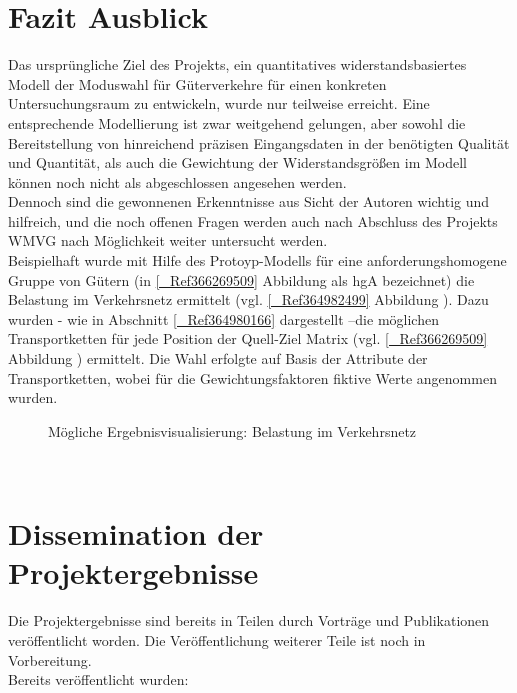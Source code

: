 % 
\section{Fazit Ausblick }
\label{_Ref365538178}
\label{_Toc365801618}
\label{_Toc366766128}
\label{_Toc366775322}
Das ursprüngliche Ziel des Projekts, ein quantitatives widerstandsbasiertes Modell der Moduswahl für Güterverkehre für einen konkreten Untersuchungsraum zu entwickeln, wurde nur teilweise erreicht. Eine entsprechende Modellierung ist zwar weitgehend gelungen, aber sowohl die Bereitstellung von hinreichend präzisen Eingangsdaten in der benötigten Qualität und Quantität, als auch die Gewichtung der Widerstandsgrößen im Modell können noch nicht als abgeschlossen angesehen werden.~\\
Dennoch sind die gewonnenen Erkenntnisse aus Sicht der Autoren wichtig und hilfreich, und die noch offenen Fragen werden auch nach Abschluss des Projekts WMVG nach Möglichkeit weiter untersucht werden. ~\\

\label{_Toc365801619}
\label{_Toc365011598} Beispielhaft wurde mit Hilfe des Protoyp-Modells für eine anforderungshomogene Gruppe von Gütern (in \autoref{_Ref366269509} Abbildung  als hgA bezeichnet) die Belastung im Verkehrsnetz ermittelt (vgl. \autoref{_Ref364982499} Abbildung ). Dazu wurden - wie in Abschnitt \autoref{_Ref364980166}  dargestellt –die möglichen Transportketten für jede Position der Quell-Ziel Matrix (vgl. \autoref{_Ref366269509} Abbildung ) ermittelt. Die Wahl erfolgte auf Basis der Attribute der Transportketten, wobei für die Gewichtungsfaktoren fiktive Werte angenommen wurden.~\\

\begin{figure}[htbp]
  \centering
  \caption{ Mögliche Ergebnisvisualisierung: Belastung im Verkehrsnetz}
  \label{_Ref364982499 _Toc366766129}
\end{figure}
~\\


% 
\section{Dissemination der Projektergebnisse }
\label{_Toc366775323}
Die Projektergebnisse sind bereits in Teilen durch Vorträge und Publikationen veröffentlicht worden. Die Veröffentlichung weiterer Teile ist noch in Vorbereitung.~\\
Bereits veröffentlicht wurden:~\\

